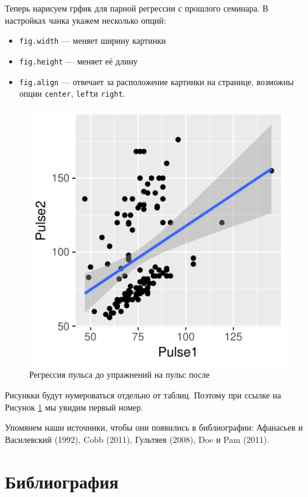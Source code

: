 \documentclass[11pt,russian,]{article}
\begin{document}
Теперь нарисуем грфик для парной регрессии с прошлого семинара. В
настройках чанка укажем несколько опций:

\begin{itemize}
\item
  \texttt{fig.width} --- меняет ширину картинки
\item
  \texttt{fig.height} --- меняет её длину
\item
  \texttt{fig.align} --- отвечает за расположение картинки на странице,
  возможны опции \texttt{center}, \texttt{left}и \texttt{right}.
\end{itemize}

\begin{figure}

{\centering \includegraphics{seminar_060_tex_files/figure-latex/reg_plot-1} 

}

\caption{\label{fig:fig1} Регрессия пульса до упражнений на пульс после}\label{fig:reg_plot}
\end{figure}

Рисункки будут нумероваться отдельно от таблиц. Поэтому при ссылке на
Рисунок \ref{fig:reg_plot} мы увидим первый номер.

Упомянем наши источники, чтобы они появились в библиографии: Афанасьев и
Василевский (1992), Cobb (2011), Гультяев (2008), Doe и Pam (2011).

\section*{Библиография}
\end{document}
